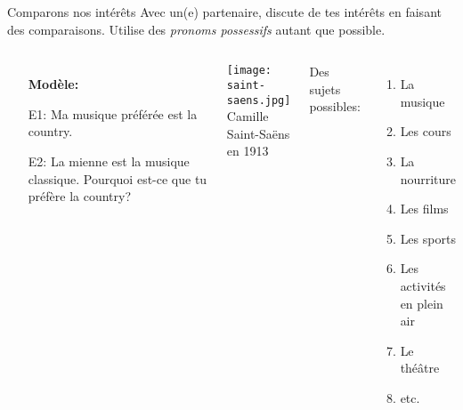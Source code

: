 \begin{frame}{Comparons nos intérêts}
  Avec un(e) partenaire, discute de tes intérêts en faisant des comparaisons.
  Utilise des \emph{pronoms possessifs} autant que possible.
  \begin{columns}
      \begin{itemize}
        \small
        \item[] \textbf{Modèle:}
        \item[E1:] Ma musique préférée est la country.
        \item[E2:] \alert{La mienne} est la musique classique. Pourquoi est-ce que tu préfère la country?
      \end{itemize}
      \begin{center}
        \texttt{[image: saint-saens.jpg]} \\
        {\scriptsize Camille Saint-Saëns en 1913}
      \end{center}
      Des sujets possibles:
      \begin{enumerate}
        \item La musique
        \item Les cours
        \item La nourriture
        \item Les films
        \item Les sports
        \item Les activités en plein air
        \item Le théâtre
        \item etc.
      \end{enumerate}
  \end{columns}
\end{frame}